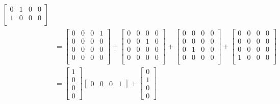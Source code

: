 \documentclass[11pt]{article}
\begin{document}
\begin{enumerate}
\begin{align*}
\begin{bmatrix}
                    0 & 1 & 0 & 0\\
                    1 & 0 & 0 & 0\\
                    \end{bmatrix} \\
                    &= 
                    \begin{bmatrix}
                    0 & 0 & 0 & 1\\
                    0 & 0 & 0 & 0\\
                    0 & 0 & 0 & 0\\
                    0 & 0 & 0 & 0\\
                    \end{bmatrix} +
                    \begin{bmatrix}
                    0 & 0 & 0 & 0\\
                    0 & 0 & 1 & 0\\
                    0 & 0 & 0 & 0\\
                    0 & 0 & 0 & 0\\
                    \end{bmatrix} +
                    \begin{bmatrix}
                    0 & 0 & 0 & 0\\
                    0 & 0 & 0 & 0\\
                    0 & 1 & 0 & 0\\
                    0 & 0 & 0 & 0\\
                    \end{bmatrix} + 
                    \begin{bmatrix}
                    0 & 0 & 0 & 0\\
                    0 & 0 & 0 & 0\\
                    0 & 0 & 0 & 0\\
                    1 & 0 & 0 & 0\\
                    \end{bmatrix} \\
                    &= \begin{bmatrix}1 \\ 0 \\ 0 \\ 0\end{bmatrix}
                       \begin{bmatrix}0 & 0 & 0 & 1\end{bmatrix} +
                       \begin{bmatrix}0 \\ 1 \\ 0 \\ 0\end{bmatrix}

\end{align*}
\end{enumerate}
\end{document}
